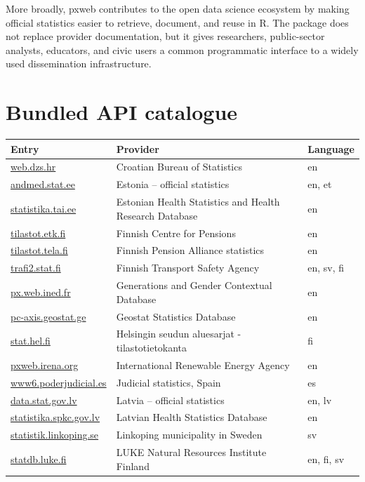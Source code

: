 \documentclass[11pt]{article}
\DeclareRobustCommand{\pkg}[1]{\textsf{#1}}
\DeclareRobustCommand{\proglang}[1]{\textsf{#1}}
\begin{document}
More broadly, \pkg{pxweb} contributes to the open data science ecosystem \citep{lahti2018open} by making official statistics easier to retrieve, document, and reuse in \proglang{R}.
The package does not replace provider documentation, but it gives researchers, public-sector analysts, educators, and civic users a common programmatic interface to a widely used dissemination infrastructure.

\clearpage

\appendix
\section{Bundled API catalogue}
\label{app:api-catalogue}


\begin{table}[!htbp]
\centering
\scriptsize
\begin{tabular}{@{}L{0.30\textwidth}L{0.46\textwidth}L{0.14\textwidth}@{}}
\hline
Entry & Provider & Language\\
\hline
\url{web.dzs.hr} & Croatian Bureau of Statistics & en\\
\url{andmed.stat.ee} & Estonia -- official statistics & en, et\\
\url{statistika.tai.ee} & Estonian Health Statistics and Health Research Database & en\\
\url{tilastot.etk.fi} & Finnish Centre for Pensions & en\\
\url{tilastot.tela.fi} & Finnish Pension Alliance statistics & en\\
\url{trafi2.stat.fi} & Finnish Transport Safety Agency & en, sv, fi\\
\url{px.web.ined.fr} & Generations and Gender Contextual Database & en\\
\url{pc-axis.geostat.ge} & Geostat Statistics Database & en\\
\url{stat.hel.fi} & Helsingin seudun aluesarjat -tilastotietokanta & fi\\
\url{pxweb.irena.org} & International Renewable Energy Agency & en\\
\url{www6.poderjudicial.es} & Judicial statistics, Spain & es\\
\url{data.stat.gov.lv} & Latvia -- official statistics & en, lv\\
\url{statistika.spkc.gov.lv} & Latvian Health Statistics Database & en\\
\url{statistik.linkoping.se} & Linkoping municipality in Sweden & sv\\
\url{statdb.luke.fi} & LUKE Natural Resources Institute Finland & en, fi, sv\\

\end{tabular}
\end{table}
\end{document}
